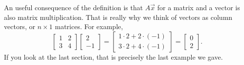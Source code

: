 An useful consequence of the definition is that $A \vec{x}$ for a matrix
and a vector is also matrix multiplication.  That is really why we think of
vectors as column vectors, or $n \times 1$ matrices.
For example,
\begin{equation*}
\begin{bmatrix}
1 & 2 \\ 3 & 4
\end{bmatrix}
\begin{bmatrix}
2 \\ -1
\end{bmatrix} 
=
\begin{bmatrix}
1 \cdot 2 + 2 \cdot (-1) \\
3 \cdot 2 + 4 \cdot (-1)
\end{bmatrix}
=
\begin{bmatrix}
0 \\ 2
\end{bmatrix}  .
\end{equation*}
If you look at the last section, that is precisely the last
example we gave.


